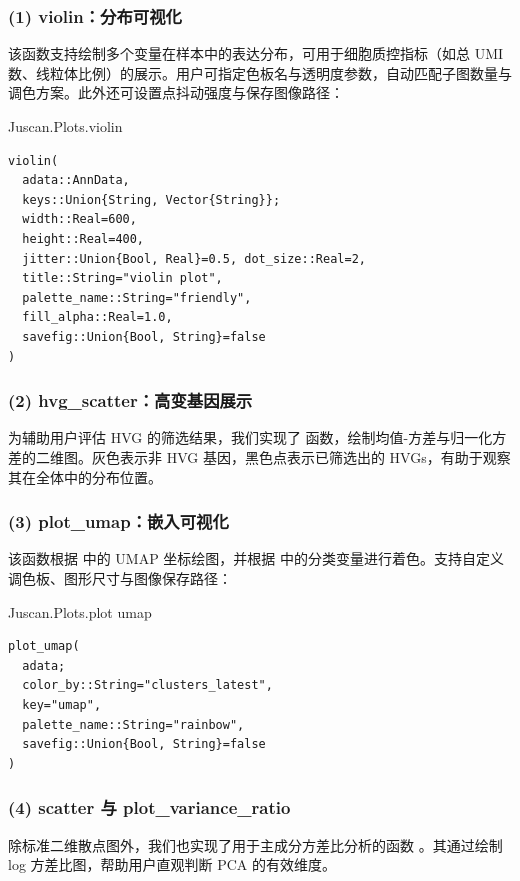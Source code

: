 \subsubsection{(1) violin：分布可视化}

该函数支持绘制多个变量在样本中的表达分布，可用于细胞质控指标（如总 UMI 数、线粒体比例）的展示。用户可指定色板名与透明度参数，自动匹配子图数量与调色方案。此外还可设置点抖动强度与保存图像路径：

\begin{fancybox}{Juscan.Plots.violin} 
  \begin{lstlisting} 
violin(
  adata::AnnData,
  keys::Union{String, Vector{String}};
  width::Real=600,
  height::Real=400,
  jitter::Union{Bool, Real}=0.5, dot_size::Real=2,
  title::String="violin plot",
  palette_name::String="friendly",
  fill_alpha::Real=1.0, 
  savefig::Union{Bool, String}=false
) 
  \end{lstlisting} 
\end{fancybox}

\subsubsection{(2) hvg\_scatter：高变基因展示}

为辅助用户评估 HVG 的筛选结果，我们实现了  函数，绘制均值-方差与归一化方差的二维图。灰色表示非 HVG 基因，黑色点表示已筛选出的 HVGs，有助于观察其在全体中的分布位置。

\subsubsection{(3) plot\_umap：嵌入可视化}

该函数根据  中的 UMAP 坐标绘图，并根据  中的分类变量进行着色。支持自定义调色板、图形尺寸与图像保存路径：

\begin{fancybox}{Juscan.Plots.plot umap}
  \begin{lstlisting} 
plot_umap(
  adata;
  color_by::String="clusters_latest",
  key="umap",
  palette_name::String="rainbow",
  savefig::Union{Bool, String}=false
) 
  \end{lstlisting} 
\end{fancybox}

\subsubsection{(4) scatter 与 plot\_variance\_ratio}

除标准二维散点图外，我们也实现了用于主成分方差比分析的函数 。其通过绘制 log 方差比图，帮助用户直观判断 PCA 的有效维度。
